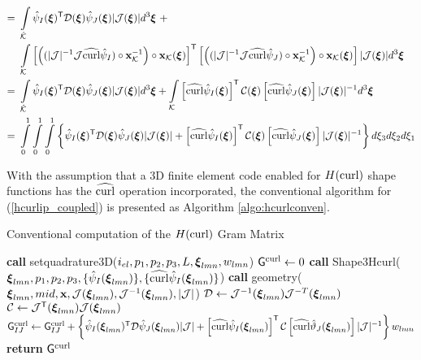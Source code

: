 \begin{align}
                =\ & \int\limits_{\hat{\mathcal{K}}}
                \hat{ \psi}_I(\boldsymbol{\xi})^{\mathsf{T}}\mathcal{D}(\boldsymbol{\xi})\hat{ \psi}_J(\boldsymbol{\xi})|\mathcal{J}(\boldsymbol{\xi})|d^3\boldsymbol{\xi} \ +\nonumber\\*
                \ & \int\limits_{\mathcal{K}}
                \left[\left((|\mathcal{J}|^{-1}\mathcal{J}\widehat{\operatorname{curl}}\hat{ \psi}_I)\circ\mathbf{x}_{\mathcal{K}}^{-1}\right)\circ\mathbf{x}_{\mathcal{K}}(\boldsymbol{\xi})\right]^{\mathsf{T}} \left[\left((|\mathcal{J}|^{-1}\mathcal{J}\widehat{\operatorname{curl}}\hat{ \psi}_J)\circ\mathbf{x}_{\mathcal{K}}^{-1}\right)\circ\mathbf{x}_{\mathcal{K}}(\boldsymbol{\xi})\right]|\mathcal{J}(\boldsymbol{\xi})|d^3\boldsymbol{\xi} \nonumber\\ 
                =\ & \int\limits_{\hat{\mathcal{K}}}
                \hat{ \psi}_I(\boldsymbol{\xi})^{\mathsf{T}}\mathcal{D}(\boldsymbol{\xi})\hat{ \psi}_J(\boldsymbol{\xi})|\mathcal{J}(\boldsymbol{\xi})|d^3\boldsymbol{\xi} +
                \int\limits_{\mathcal{K}} \left[\widehat{\operatorname{curl}}\hat{ \psi}_I(\boldsymbol{\xi})\right]^{\mathsf{T}}\mathcal{C}(\boldsymbol{\xi})\left[\widehat{\operatorname{curl}}\hat{ \psi}_J(\boldsymbol{\xi})\right]|\mathcal{J}(\boldsymbol{\xi})|^{-1}d^3\boldsymbol{\xi} \nonumber \\ 
                =\ & \int\limits_0^1\int\limits_0^1\int\limits_0^1\left\{\hat{ \psi}_I(\boldsymbol{\xi})^{\mathsf{T}}\mathcal{D}(\boldsymbol{\xi})\hat{ \psi}_J(\boldsymbol{\xi})|\mathcal{J}(\boldsymbol{\xi})| +\left[\widehat{\operatorname{curl}}\hat{ \psi}_I(\boldsymbol{\xi})\right]^{\mathsf{T}}\mathcal{C}(\boldsymbol{\xi})\left[\widehat{\operatorname{curl}}\hat{\psi}_J(\boldsymbol{\xi})\right]|\mathcal{J}(\boldsymbol{\xi})|^{-1}\right\} d\xi_3d\xi_2d\xi_1
    \label{hcurlip_coupled}
\end{align}

With the assumption that a 3D finite element code enabled for $H(\operatorname{curl})$ shape functions has the $\widehat{\operatorname{curl}}$ operation incorporated, the conventional algorithm for (\ref{hcurlip_coupled}) is presented as Algorithm \ref{algo:hcurlconven}.
% 
\begin{algorithm}[ht]
\caption{Conventional computation of the $H(\operatorname{curl})$ Gram Matrix}\label{algo:hcurlconven}
\begin{algorithmic}
\State\textbf{call }setquadrature3D($i_{el},p_1,p_2,p_3,L,\boldsymbol{\xi}_{lmn},w_{lmn}$)
\State $\mathsf{G}^{\operatorname{curl}} \gets 0$
            \State\textbf{call } Shape3Hcurl($\boldsymbol{\xi}_{lmn},p_1,p_2,p_3,\{\hat{\psi}_I(\boldsymbol{\xi}_{lmn})\},\{\widehat{\operatorname{curl}}\hat{\psi}_I(\boldsymbol{\xi}_{lmn})\}$)
            \State\textbf{call } geometry( $\boldsymbol{\xi}_{lmn},mid,\mathbf{x},\mathcal{J}(\boldsymbol{\xi}_{lmn}),\mathcal{J}^{-1}(\boldsymbol{\xi}_{lmn}),|\mathcal{J}|$)
            \State $\mathcal{D}\gets\mathcal{J}^{-1}(\boldsymbol{\xi}_{lmn})\mathcal{J}^{-T}(\boldsymbol{\xi}_{lmn})$
            \State $\mathcal{C}\gets\mathcal{J}^{\mathsf{T}}(\boldsymbol{\xi}_{lmn})\mathcal{J}(\boldsymbol{\xi}_{lmn})$
                    \State $\mathsf{G}_{IJ}^{\operatorname{curl}} \gets \mathsf{G}_{IJ}^{\operatorname{curl}}+\left\{\hat{\psi}_I(\boldsymbol{\xi}_{lmn})^{\mathsf{T}}\mathcal{D}\hat{\psi}_J(\boldsymbol{\xi}_{lmn})|\mathcal{J}| + \left[\widehat{\operatorname{curl}}\hat{\psi}_I(\boldsymbol{\xi}_{lmn})\right]^{\mathsf{T}}\mathcal{C}\left[\widehat{\operatorname{curl}}\hat{\vartheta}_J(\boldsymbol{\xi}_{lmn}) \right]|\mathcal{J}|^{-1}\right\}w_{lmn}$
                \EndFor
            \EndFor
\EndFor
\State \textbf{return} $\mathsf{G}^{\operatorname{curl}}$
\EndProcedure
\end{algorithmic}
\end{algorithm}

